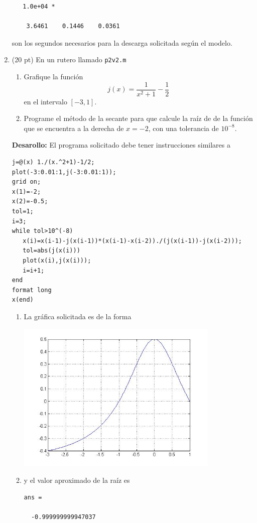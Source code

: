 \documentclass[11pt]{article}
\begin{document}
\begin{enumerate}
\begin{lstlisting}
   1.0e+04 *

    3.6461    0.1446    0.0361

\end{lstlisting}
son los segundos necesarios para la descarga solicitada según el modelo.
\item (20 pt) En un rutero llamado \texttt{p2v2.m}
\begin{enumerate}
\item Grafique la funci\'on
$$
j(x)=\frac{1}{x^2+1}-\frac{1}{2}
$$
en el intervalo $[-3,1]$.
\item Programe el m\'etodo de la secante para que calcule la ra\'iz de de la funci\'on que se encuentra a la derecha de $x=-2$, con una tolerancia de $10^{-8}$.
\end{enumerate}
\textbf{Desarollo:} 
El programa solicitado debe tener instrucciones similares a 
\begin{lstlisting}
j=@(x) 1./(x.^2+1)-1/2;
plot(-3:0.01:1,j(-3:0.01:1));
grid on;
x(1)=-2;
x(2)=-0.5;
tol=1;
i=3;
while tol>10^(-8)
   x(i)=x(i-1)-j(x(i-1))*(x(i-1)-x(i-2))./(j(x(i-1))-j(x(i-2)));
   tol=abs(j(x(i)))
   plot(x(i),j(x(i)));
   i=i+1;
end
format long
x(end)
\end{lstlisting}
\begin{enumerate}
	\item La gr\'afica solicitada es de la forma
    \begin{center}
    \includegraphics[width=0.8\textwidth]{./p2v2.jpg}
    \end{center}
    \item y el valor aproximado de la ra\'iz es
    \begin{lstlisting}
ans =

  -0.999999999947037
    \end{lstlisting}
\end{enumerate}
\end{enumerate}
\end{document}
